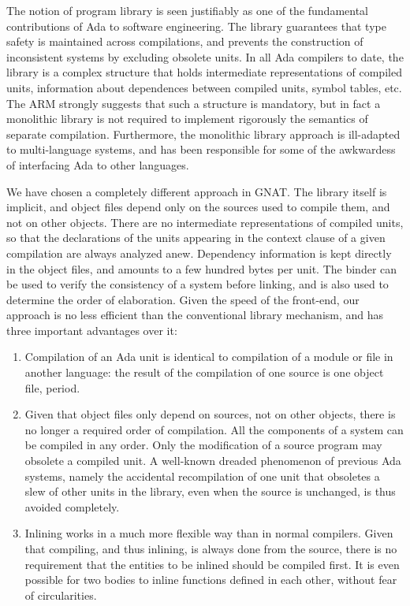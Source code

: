 The notion of program library is seen justifiably as one of the fundamental
contributions of Ada to software engineering. The library guarantees that
type safety is maintained across compilations,  and prevents the construction
of inconsistent systems by excluding obsolete units. In  all Ada compilers
to date, the library is a complex structure that holds intermediate 
representations of compiled units, information about dependences between
compiled units, symbol
tables, etc. The ARM strongly suggests that such a structure is mandatory,
but in fact a monolithic library is not required to implement rigorously 
the semantics of separate compilation. Furthermore,  the monolithic library
approach is ill-adapted to multi-language systems, and has been responsible
for some of the awkwardess of interfacing Ada to other languages.

We have chosen a completely different approach in GNAT. The library itself
is implicit, and object files depend only on the sources used to
compile them, and not on other objects.  There are no intermediate
representations of compiled units, so that the declarations of the units
appearing in the context clause of a given compilation are always analyzed
anew. Dependency information is kept directly in the object files, and
amounts to a few hundred bytes per unit. The binder can be used to
verify the consistency of a system before linking, and is also used
to determine the order of elaboration.  Given the speed of the front-end,
our approach is no less efficient than the conventional library mechanism,
and has three important advantages over it:

\begin{enumerate}

\item Compilation of an Ada unit is identical to compilation of a
module or file in another language: the result of the compilation of one
source is one object file,  period. 

\item Given that object files only depend on sources, not on other objects,
there is no longer a required order of compilation. All the components of
a system can be compiled in any order. Only the modification of a source
program may obsolete a compiled unit. A well-known dreaded phenomenon of
previous Ada systems, namely the accidental recompilation of one unit that
obsoletes a slew of other units in the library, even when the source is
unchanged, is thus avoided completely.

\item Inlining works in a much more flexible way than in  normal compilers.
Given that compiling, and thus inlining,  is always done from the source,
there is no requirement that the entities to be inlined should be compiled
first. It is even possible for two bodies to inline functions defined in 
each other, without fear of circularities. 

\end{enumerate}

